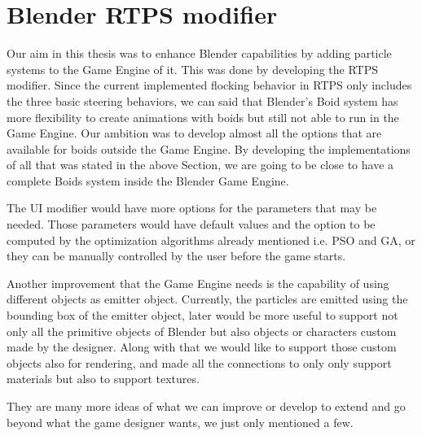 \section{Blender RTPS modifier}
Our aim in this thesis was to enhance Blender capabilities by adding particle systems to the Game Engine of it. This was done by developing the RTPS modifier. Since the current implemented flocking behavior in RTPS only includes the three basic steering behaviors, we can said that Blender's Boid system has more flexibility to create animations with boids but still not able to run in the Game Engine. Our ambition was to develop almost all the options that are available for boids outside the Game Engine. By developing the implementations of all that was stated in the above Section, we are going to be close to have a complete Boids system inside the Blender Game Engine.  

The UI modifier would have more options for the parameters that may be needed. Those parameters would have default values and the option to be computed by the optimization algorithms already mentioned i.e. PSO and GA, or they can be manually controlled by the user before the game starts.

Another improvement that the Game Engine needs is the capability of using different objects as emitter object. Currently, the particles are emitted using the bounding box of the emitter object, later would be more useful to support not only all the primitive objects of Blender but also objects or characters custom made by the designer. Along with that we would like to support those custom objects also for rendering, and made all the connections to only only support materials but also to support textures.

They are many more ideas of what we can improve or develop to extend and go beyond what the game designer wants, we just only mentioned a few.

